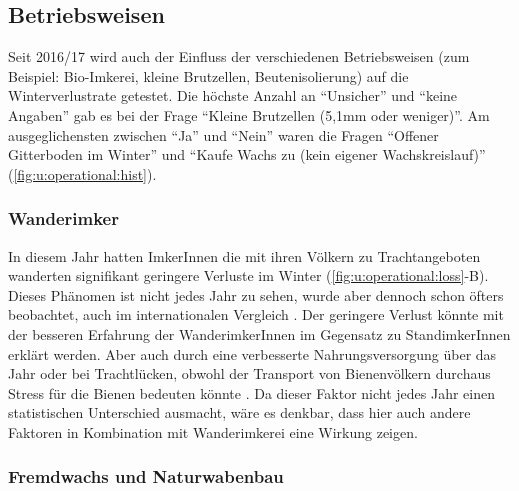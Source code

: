 \subsection{Betriebsweisen}

Seit 2016/17 wird auch der Einfluss der verschiedenen Betriebsweisen (zum Beispiel: Bio-Imkerei, kleine Brutzellen, Beutenisolierung) auf die Winterverlustrate getestet. Die höchste Anzahl an \enquote{Unsicher} und \enquote{keine Angaben} gab es bei der Frage \enquote{Kleine Brutzellen (5,1mm oder weniger)}. Am ausgeglichensten zwischen \enquote{Ja} und \enquote{Nein} waren die Fragen \enquote{Offener Gitterboden im Winter} und \enquote{Kaufe Wachs zu (kein eigener Wachskreislauf)} (\cref{fig:u:operational:hist}).

\subsubsection{Wanderimker}

In diesem Jahr hatten ImkerInnen die mit ihren Völkern zu Trachtangeboten wanderten signifikant geringere Verluste im Winter (\cref{fig:u:operational:loss}-B). Dieses Phänomen ist nicht jedes Jahr zu sehen,  wurde aber dennoch schon öfters beobachtet, auch im internationalen Vergleich \citep{brodschneider2010, crailsheim2018, brodschneider2018, oberreiter2020, gray2020}. Der geringere Verlust könnte mit der besseren Erfahrung der WanderimkerInnen im Gegensatz zu StandimkerInnen erklärt werden. Aber auch durch eine verbesserte Nahrungsversorgung über das Jahr oder bei Trachtlücken, obwohl der Transport von Bienenvölkern durchaus Stress für die Bienen bedeuten könnte \citep{vanderzee2014}. Da dieser Faktor nicht jedes Jahr einen statistischen Unterschied ausmacht, wäre es denkbar, dass hier auch andere Faktoren in Kombination mit Wanderimkerei eine Wirkung zeigen.

\subsubsection{Fremdwachs und Naturwabenbau}

